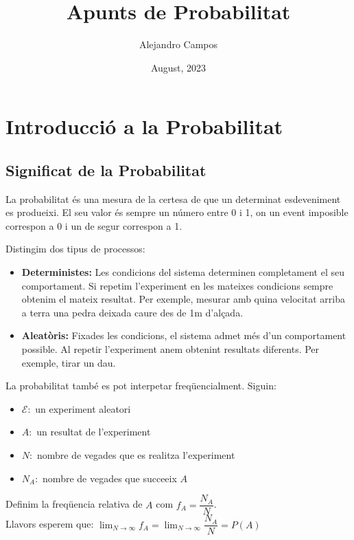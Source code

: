 \documentclass{article}
\title{\textbf{Apunts de Probabilitat}}
\author{Alejandro Campos}
\date{August, 2023}
\begin{document}
\maketitle
\newpage
\tableofcontents

\newpage

\section{Introducció a la Probabilitat}

\subsection{Significat de la Probabilitat}

La probabilitat és una mesura de la certesa de que un determinat esdeveniment es produeixi. El seu valor és sempre un número entre 0 i 1, on un event imposible correspon a 0 i un de segur correspon a 1.

Distingim dos tipus de processos:
\begin{itemize}
    \item \textbf{Deterministes:} Les condicions del sistema determinen completament el seu comportament. Si repetim l’experiment en les mateixes condicions sempre obtenim el mateix resultat. Per exemple, mesurar amb quina velocitat arriba a terra una pedra deixada caure des de 1m d’alçada.
    \item \textbf{Aleatòris:} Fixades les condicions, el sistema admet més d’un comportament possible. Al repetir l’experiment anem obtenint resultats diferents. Per exemple, tirar un dau.
\end{itemize}

La probabilitat també es pot interpetar freqüencialment. Siguin:
\begin{itemize}
    \item $\mathcal{E}:$ un experiment aleatori
    \item $A:$ un resultat de l'experiment
    \item $N:$ nombre de vegades que es realitza l'experiment
    \item $N_A:$ nombre de vegades que succeeix $A$
\end{itemize}

Definim la freqüencia relativa de $A$ com $f_A = \dfrac{N_A}{N}$.\\

Llavors esperem que: $\displaystyle \lim_{N\to\infty} f_A = \displaystyle \lim_{N\to\infty} \dfrac{N_A}{N} = P(A)$
\end{document}
